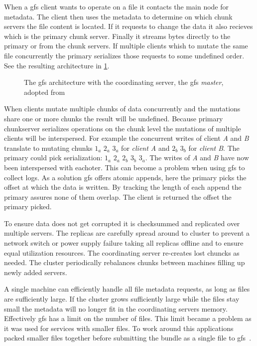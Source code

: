 When a \ac{gfs} client wants to operate on a file it contacts the main node for metadata. The client then uses the metadata to determine on which chunk servers the file content is located. If it requests to change the data it also recieves which is the primary chunk server. Finally it streams bytes directly to the primary or from the chunk servers. If multiple clients whish to mutate the same file concurrently the primary serializes those requests to some undefined order. See the resulting architecture in \cref{fig:GFS_arch}.
%
\begin{figure}[htbp]
	\centering
	
	\caption{The \ac{gfs} architecture with the coordinating server, the \ac{gfs} \textit{master}, adopted from~\cite{GFS}}
	\label{fig:GFS_arch}
\end{figure}
%
When clients mutate multiple chunks of data concurrently and the mutations share one or more chunks the result will be undefined. Because primary chunkserver serializes operations on the chunk level the mutations of multiple clients will be interspersed. For example the concurrent writes of client \textit{A} and \textit{B} translate to mutating chunks $1_a$ $2_a$ $3_a$ for \textit{client A} and $2_b$ $3_b$ for \textit{client B}. The primary could pick serialization: $1_a$ $2_a$ $2_b$ $3_b$ $3_a$. The writes of \textit{A} and \textit{B} have now been interspersed with eachoter. This can become a problem when using \ac{gfs} to collect logs. As a solution \ac{gfs} offers atomic appends, here the primary picks the offset at which the data is written. By tracking the length of each append the primary assures none of them overlap. The client is returned the offset the primary picked.

To ensure data does not get corrupted it is checksummed and replicated over multiple servers. The replicas are carefully spread around to cluster to prevent a network switch or power supply failure taking all replicas offline and to ensure equal utilization resources. The coordinating server re-creates lost chuncks as needed. The cluster periodically rebalances chunks between machines filling up newly added servers. 

A single machine can efficiently handle all file metadata requests, as long as files are sufficiently large. If the cluster grows sufficiently large while the files stay small the metadata will no longer fit in the coordinating servers memory. Effectively \ac{gfs} has a limit on the number of files. This limit became a problem as it was used for services with smaller files. To work around this applications packed smaller files together before submitting the bundle as a single file to \ac{gfs}~\cite{GFS_interview}.

